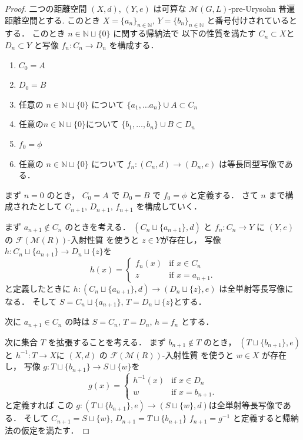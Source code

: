 \documentclass[leqno, 12pt]{jsarticle}
\newcommand{\nn}{\mathbb{N}}
\begin{document}
\begin{proof}
二つの距離空間
$(X, d)$, 
$(Y, e)$
は可算な
$\mathscr{M}(G, L)$-pre-Urysohn
普遍距離空間とする. 
このとき
$X=\{a_{n}\}_{n\in \nn}$,
$Y=\{b_{n}\}_{n\in \nn}$
と番号付けされているとする．
このとき
$n\in \nn\sqcup\{0\}$
に関する帰納法で
以下の性質を満たす
$C_{n}\subset X$と$D_{n}\subset Y$
と写像
$f_{n}\colon  C_{n}\to D_{n}$
を構成する．
\begin{enumerate}
\item 
$C_{0}=A$
\item 
$D_{0}=B$
\item 
任意の
$n\in \nn\sqcup\{0\}$
について
$\{a_{1}, \dots a_{n}\}\cup A\subset C_{n}$
\item 
任意の$n\in \nn\sqcup\{0\}$について
$\{b_{1}, \dots, b_{n}\}\cup B\subset D_{n}$
\item 
$f_0=\phi$
\item 
任意の
$n\in \nn\sqcup\{0\}$
について
$f_{n}\colon  (C_{n}, d)\to (D_{n}, e)$
は等長同型写像である．
\end{enumerate}
まず
$n=0$
のとき，
$C_{0}=A$
で
$D_{0}=B$
で
$f_{0}=\phi$
と定義する．
さて
$n$
まで構成されたとして
 $C_{n+1}$, 
 $D_{n+1}$, 
 $f_{n+1}$
 を構成していく．
 
まず
$a_{n+1}\not\in C_{n}$
のときを考える．
$(C_{n}\sqcup\{a_{n+1}\}, d)$
と
$f_{n}\colon  C_n\to Y$
に
$(Y, e)$
の
$\mathscr{F}(\mathscr{M}(R))$-入射性質
を使うと
$z\in Y$が存在し，
写像
$h\colon  C_{n}\sqcup \{a_{n+1}\}\to D_{n}\sqcup \{z\}$を
\[
h(x)=
\begin{cases}
	f_{n}(x) & \text{if $x\in C_{n}$}\\
	z & \text{if $x=a_{n+1}$}. 
\end{cases}
\]
と定義したときに
$h\colon  (C_{n}\sqcup \{a_{n+1}\}, d)\to (D_{n}\sqcup \{z\}, e)$
は全単射等長写像になる．
そして
$S=C_{n}\sqcup \{a_{n+1}\}$, 
$T=D_{n}\sqcup\{z\}$とする．

次に
$a_{n+1}\in C_{n}$
の時は
$S=C_{n}$, 
$T=D_{n}$, 
$h=f_{n}$
とする．




次に集合
$T$
を拡張することを考える．
まず
$b_{n+1}\not\in T$
のとき，
$(T\sqcup\{b_{n+1}\}, e)$
と
$h^{-1}\colon  T\to X$に
$(X, d)$
の
$\mathscr{F}(\mathscr{M}(R))$-入射性質
を使うと
$w\in X$
が存在し，
写像
$g: T\sqcup\{b_{n+1}\}\to S\sqcup\{w\}$を
\[
g(x)=
\begin{cases}
	h^{-1}(x) & \text{if $x\in D_{n}$}\\
	w & \text{if $x=b_{n+1}$}. 
\end{cases}
\]
と定義すれば
この
$g\colon  (T\sqcup \{b_{n+1}\}, e)\to (S\sqcup\{w\}, d)$は全単射等長写像である．
そして
$C_{n+1}=S\sqcup \{w\}$, 
$D_{n+1}=T\sqcup \{b_{n+1}\}$
$f_{n+1}=g^{-1}$
と定義すると帰納法の仮定を満たす．



\end{proof}
\end{document}

